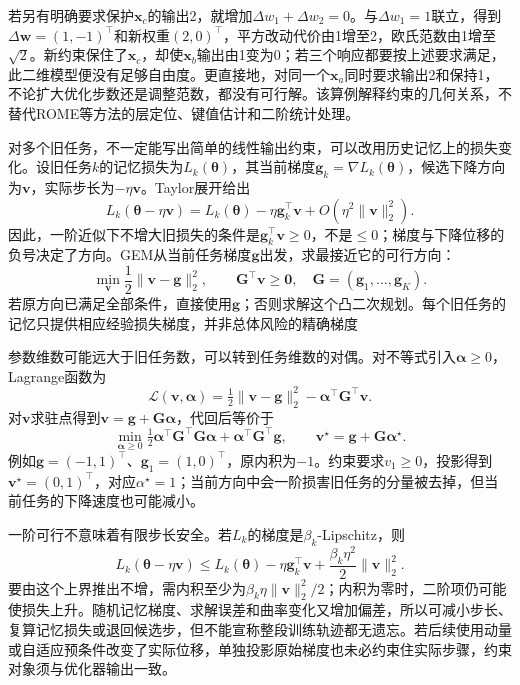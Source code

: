 若另有明确要求保护$\bm x_c$的输出2，就增加$\Delta w_1+\Delta w_2=0$。与$\Delta w_1=1$联立，得到$\Delta\bm w=(1,-1)^\top$和新权重$(2,0)^\top$，平方改动代价由1增至2，欧氏范数由1增至$\sqrt2$。新约束保住了$\bm x_c$，却使$\bm x_b$输出由1变为0；若三个响应都要按上述要求满足，此二维模型便没有足够自由度。更直接地，对同一个$\bm x_a$同时要求输出2和保持1，不论扩大优化步数还是调整范数，都没有可行解。该算例解释约束的几何关系，不替代ROME等方法的层定位、键值估计和二阶统计处理。

对多个旧任务，不一定能写出简单的线性输出约束，可以改用历史记忆上的损失变化。设旧任务$k$的记忆损失为$L_k(\bm\theta)$，其当前梯度$\bm g_k=\nabla L_k(\bm\theta)$，候选下降方向为$\bm v$，实际步长为$-\eta\bm v$。Taylor展开给出
\begin{equation}
L_k(\bm\theta-\eta\bm v)
=L_k(\bm\theta)-\eta\bm g_k^\top\bm v
+O(\eta^2\lVert\bm v\rVert_2^2).
\label{eq:ket-update-gradient-taylor}
\end{equation}
因此，一阶近似下不增大旧损失的条件是$\bm g_k^\top\bm v\ge0$，不是$\le0$；梯度与下降位移的负号决定了方向。GEM从当前任务梯度$\bm g$出发，求最接近它的可行方向：
\begin{equation}
\min_{\bm v}\frac12\lVert\bm v-\bm g\rVert_2^2,
\qquad \bm G^\top\bm v\ge\bm0,
\quad
\bm G=(\bm g_1,\ldots,\bm g_K).
\label{eq:ket-update-gem}
\end{equation}
若原方向已满足全部条件，直接使用$\bm g$；否则求解这个凸二次规划。每个旧任务的记忆只提供相应经验损失梯度，并非总体风险的精确梯度

参数维数可能远大于旧任务数，可以转到任务维数的对偶。对不等式引入$\bm\alpha\ge0$，Lagrange函数为
\[
\mathcal L(\bm v,\bm\alpha)
=\tfrac12\lVert\bm v-\bm g\rVert_2^2
-\bm\alpha^\top\bm G^\top\bm v.
\]
对$\bm v$求驻点得到$\bm v=\bm g+\bm G\bm\alpha$，代回后等价于
\begin{equation}
\min_{\bm\alpha\ge0}
\tfrac12\bm\alpha^\top\bm G^\top\bm G\bm\alpha
+\bm\alpha^\top\bm G^\top\bm g,
\qquad
\bm v^\star=\bm g+\bm G\bm\alpha^\star.
\label{eq:ket-update-gem-dual}
\end{equation}
例如$\bm g=(-1,1)^\top$、$\bm g_1=(1,0)^\top$，原内积为$-1$。约束要求$v_1\ge0$，投影得到$\bm v^\star=(0,1)^\top$，对应$\alpha^\star=1$；当前方向中会一阶损害旧任务的分量被去掉，但当前任务的下降速度也可能减小。

一阶可行不意味着有限步长安全。若$L_k$的梯度是$\beta_k$-Lipschitz，则
\[
L_k(\bm\theta-\eta\bm v)
\le L_k(\bm\theta)-\eta\bm g_k^\top\bm v
+\frac{\beta_k\eta^2}{2}\lVert\bm v\rVert_2^2.
\]
要由这个上界推出不增，需内积至少为$\beta_k\eta\lVert\bm v\rVert_2^2/2$；内积为零时，二阶项仍可能使损失上升。随机记忆梯度、求解误差和曲率变化又增加偏差，所以可减小步长、复算记忆损失或退回候选步，但不能宣称整段训练轨迹都无遗忘。若后续使用动量或自适应预条件改变了实际位移，单独投影原始梯度也未必约束住实际步骤，约束对象须与优化器输出一致。

